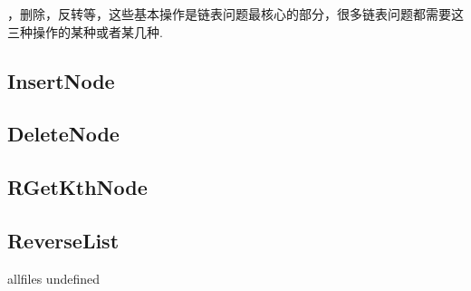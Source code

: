 \documentclass{article}
\begin{document}
\begin{CJK}{UTF8}{gbsn}     %

\else
    
，删除，反转等，这些基本操作是链表问题最核心的部分，很多链表问题都需要这三种操作的某种或者某几种.
\subsection{InsertNode}

\subsection{DeleteNode}

\subsection{RGetKthNode}

\subsection{ReverseList}


\fi

\ifx allfiles undefined
\end{CJK}
\end{document}
